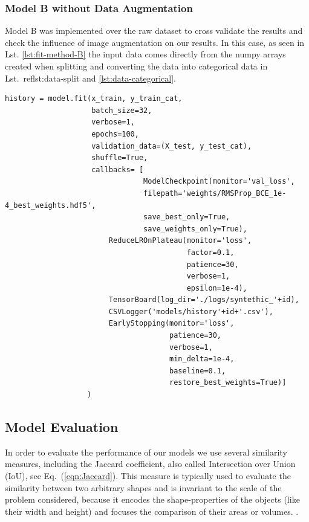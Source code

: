 \documentclass[12pt,a4paper]{scrartcl}
\begin{document}
\subsubsection{Model B without Data Augmentation}

Model B was implemented over the raw dataset to cross validate the results and check the influence of image augmentation on our results. In this case, as seen in Lst. \ref{lst:fit-method-B} the input data comes directly from the numpy arrays created when splitting and converting the data into categorical data in Lst.~ref{lst:data-split} and \ref{lst:data-categorical}. 

\begin{lstlisting}[caption={Model B training parameters, this is a code snippet from the  \emph{train\_model\_B} method in \emph{train.py}},label={lst:fit-method-B}]
history = model.fit(x_train, y_train_cat,
                    batch_size=32,
                    verbose=1, 
                    epochs=100, 
                    validation_data=(X_test, y_test_cat), 
                    shuffle=True,
                    callbacks= [
                                ModelCheckpoint(monitor='val_loss',
                                filepath='weights/RMSProp_BCE_1e-4_best_weights.hdf5',
                                save_best_only=True,
                                save_weights_only=True),
                        ReduceLROnPlateau(monitor='loss',
                                          factor=0.1,
                                          patience=30,
                                          verbose=1,
                                          epsilon=1e-4),
                        TensorBoard(log_dir='./logs/syntethic_'+id),
                        CSVLogger('models/history'+id+'.csv'),
                        EarlyStopping(monitor='loss',
                                      patience=30,
                                      verbose=1,
                                      min_delta=1e-4,
                                      baseline=0.1,
                                      restore_best_weights=True)]
                   )

\end{lstlisting}

\subsection{Model Evaluation}
In order to evaluate the performance of our models we use several similarity measures, including the Jaccard coefficient, also called Intersection over Union (IoU), see Eq.~(\ref{eqn:Jaccard}). This measure is typically used to evaluate the similarity  between two arbitrary shapes and is invariant to the scale of the problem considered, because it encodes the shape-properties of the objects (like their width and height) and focuses the comparison of their areas or volumes.
\cite{IoU:2019}.
\end{document}
